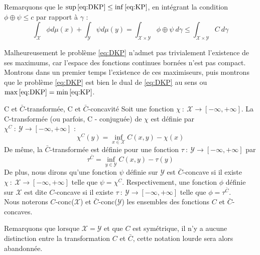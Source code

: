 \documentclass[a4paper,12pt]{article}
\begin{document}
\vspace{0.3cm}

Remarquons que le $\sup\eqref{eq:DKP} \leq \inf\eqref{eq:KP}$, en intégrant la condition $\phi\oplus\psi \leq c$ par rapport à $\gamma$ : 
$$
\int_{\mathcal{X}} \phi d\mu (x) + \int_{\mathcal{Y}}\psi d\mu(y) = \int_{\mathcal{X}\times\mathcal{Y}} \phi\oplus\psi\ d\gamma \leq \int_{\mathcal{X}\times\mathcal{Y}} C\ d\gamma
$$

Malheureusement le problème \eqref{eq:DKP} n'admet pas trivialement l'existence de ses maximums, car l'espace des fonctions continues bornées n'est pas compact. Montrons dans un premier temps l'existence de ces maximiseurs, puis montrons que le problème \eqref{eq:DKP} est bien le dual de \eqref{eq:DKP} au sens ou $\max\eqref{eq:DKP} =\min\eqref{eq:KP}$.
\newpage

\begin{definition}{C et $\bar{C}$-transformée, C et $\bar{C}$-concavité}
Soit une fonction $\chi\ :\ \mathcal{X}\rightarrow [-\infty,+\infty]$. La C-transformée (ou parfois, C - conjuguée) de $\chi$ est définie par $\chi^C\ : \ \mathcal{Y}\rightarrow[-\infty,+\infty]$ : 
$$
\chi^C(y)=\inf_{x\in\mathcal{X}} C(x,y) -\chi(x)
$$
De même, la $\bar{C}$-transformée est définie pour une fonction $\tau\ :\ \mathcal{Y}\rightarrow [-\infty,+\infty]$ par 
$$
\tau^{\bar{C}} = \inf_{y\in\mathcal{Y}} C(x,y) -\tau(y)
$$
De plus, nous dirons qu'une fonction $\psi$ définie sur $\mathcal{Y}$ est $\bar{C}$-concave si il existe $\chi\ :\ \mathcal{X}\rightarrow [-\infty,+\infty]$ telle que $\psi = \chi^C$. Respectivement, une fonction $\phi$ définie sur $\mathcal{X}$ est dite $C$-concave si il existe $\tau\ :\ \mathcal{Y}\rightarrow [-\infty,+\infty]$ telle que $\phi=\tau^{\bar{C}}$. \\
Nous noterons $C$-conc($\mathcal{X}$) et $\bar{C}$-conc($\mathcal{Y}$) les ensembles des fonctions $C$ et $\bar{C}$-concaves. 
\end{definition}
Remarquons que lorsque $\mathcal{X}=\mathcal{Y}$ et que $C$ est symétrique, il n'y a aucune distinction entre la transformation $C$ et $\bar{C}$, cette notation lourde sera alors abandonnée. \\
\end{document}
